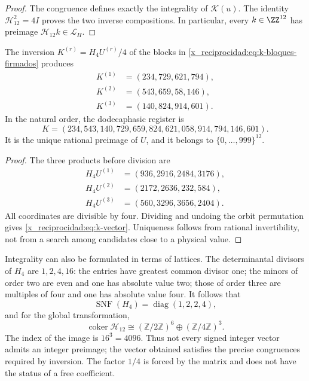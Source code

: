 \begin{proof}
The congruence defines exactly the integrality of \(\mathscr K(u)\).
The identity \(\mathcal H_{12}^2=4I\) proves the two inverse
compositions. In particular, every \(k\in\ZZ^{12}\) has preimage
\(\mathcal H_{12}k\in\mathcal L_H\).
\end{proof}

\begin{proposition}
\label{x_reciprocidad:prop:k-sello}
The inversion \(K^{(r)}=H_4U^{(r)}/4\) of the blocks in
\eqref{x_reciprocidad:eq:k-bloques-firmados} produces
\begin{align*}
 K^{(1)}&=(234,729,621,794),\\
 K^{(2)}&=(543,659,58,146),\\
 K^{(3)}&=(140,824,914,601).
\end{align*}
In the natural order, the dodecaphasic register is
\begin{equation}
 K=(234,543,140,729,659,824,621,058,914,794,146,601).
 \label{x_reciprocidad:eq:k-vector}
\end{equation}
It is the unique rational preimage of \(U\), and it belongs to
\(\{0,\ldots,999\}^{12}\).
\end{proposition}

\begin{proof}
The three products before division are
\begin{align*}
 H_4U^{(1)}&=(936,2916,2484,3176),\\
 H_4U^{(2)}&=(2172,2636,232,584),\\
 H_4U^{(3)}&=(560,3296,3656,2404).
\end{align*}
All coordinates are divisible by four. Dividing and undoing the
orbit permutation gives \eqref{x_reciprocidad:eq:k-vector}. Uniqueness follows from
rational invertibility, not from a search among candidates close to
a physical value.
\end{proof}

Integrality can also be formulated in terms of lattices. The
determinantal divisors of \(H_4\) are \(1,2,4,16\): the entries
have greatest common divisor one; the minors of order two are even and
one has absolute value two; those of order three are multiples of four and
one has absolute value four. It follows that
\[
 \operatorname{SNF}(H_4)=\operatorname{diag}(1,2,2,4),
\]
and for the global transformation,
\[
 \operatorname{coker}\mathcal H_{12}
 \cong(\mathbb Z/2\mathbb Z)^6\oplus(\mathbb Z/4\mathbb Z)^3.
\]
The index of the image is \(16^3=4096\). Thus not every signed integer
vector admits an integer preimage; the vector obtained satisfies the
precise congruences required by inversion. The factor \(1/4\) is
forced by the matrix and does not have the status of a free coefficient.

